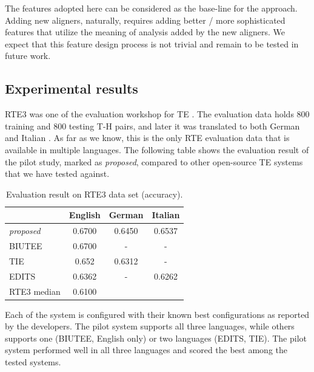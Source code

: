 \documentclass[11pt,letterpaper]{article}
\begin{document}
The features adopted here can be considered as the base-line for the
approach. Adding new aligners, naturally, requires adding better /
more sophisticated features that utilize the meaning of analysis added
by the new aligners. We expect that this feature design process is not
trivial and remain to be tested in future work. 

\subsection{Experimental results} 
RTE3 was one of the evaluation workshop for TE \cite{}. The evaluation
data holds 800 training and 800 testing T-H pairs, and later it was
translated to both German and Italian \cite{}. As far as we know, this
is the only RTE evaluation data that is available in multiple
languages. The following table shows the evaluation result of the
pilot study, marked as {\em proposed}, compared to other open-source
TE systems that we have tested against. 

\begin{table}[t!]
\centering
\small
\begin{tabular}{l|ccc}
          &   English   &   German   &   Italian \\
\hline
{\em proposed}&   0.6700      &   0.6450    &  0.6537  \\
BIUTEE        &   0.6700      &     -       &     -    \\
TIE           &   0.652       &   0.6312    &     -    \\ 
EDITS         &   0.6362      &     -       &  0.6262  \\
RTE3 median   &   0.6100      &             &          \\

\end{tabular}
\caption{Evaluation result on RTE3 data set (accuracy).}
\label{table:rte3}
\end{table}

Each of the system is configured with their known best configurations
as reported by the developers. The pilot system supports all three
languages, while others supports one (BIUTEE, English only) or two
languages (EDITS, TIE). The pilot system performed well in all
three languages and scored the best among the tested systems.
\end{document}
